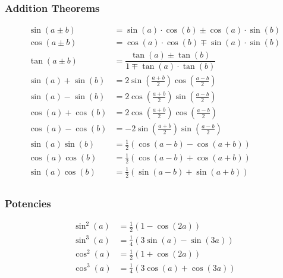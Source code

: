 \subsubsection{Addition Theorems}
\begin{align*}
	\sin(a \pm b)&=\sin(a) \cdot \cos(b) \pm \cos(a) \cdot \sin(b)\\
	\cos(a \pm b)&=\cos(a) \cdot \cos(b) \mp \sin(a) \cdot \sin(b)\\	
	\tan(a \pm b)&=\dfrac{\tan(a) \pm \tan(b)}{1 \mp \tan(a) \cdot \tan(b)}\\
	\sin(a)+\sin(b) &= 2\sin\left(\frac{a + b}{2}\right)\cos\left(\frac{a - b}{2}\right)\\
	\sin(a)-\sin(b) &= 2\cos\left(\frac{a + b}{2}\right)\sin\left(\frac{a - b}{2}\right)\\
	\cos(a)+\cos(b) &= 2\cos\left(\frac{a + b}{2}\right)\cos\left(\frac{a - b}{2}\right)\\
	\cos(a)-\cos(b) &= -2\sin\left(\frac{a + b}{2}\right)\sin\left(\frac{a - b}{2}\right)\\
	\sin(a)\sin(b)&=\frac{1}{2}(\cos(a-b)-\cos(a+b))\\
	\cos(a)\cos(b)&=\frac{1}{2}(\cos(a-b)+\cos(a+b))\\
	\sin(a)\cos(b)&=\frac{1}{2}(\sin(a-b)+\sin(a+b))\\
\end{align*}

\subsubsection{Potencies}
\begin{align*}
	\sin^2(a) &= \frac{1}{2}(1 - \cos(2a)) \\
	\sin^3(a) &= \frac{1}{4}(3\sin(a) - \sin(3a)) \\
	\cos^2(a) &= \frac{1}{2}(1 + \cos(2a)) \\
	\cos^3(a) &= \frac{1}{4}(3\cos(a) + \cos(3a)) \\
\end{align*}

